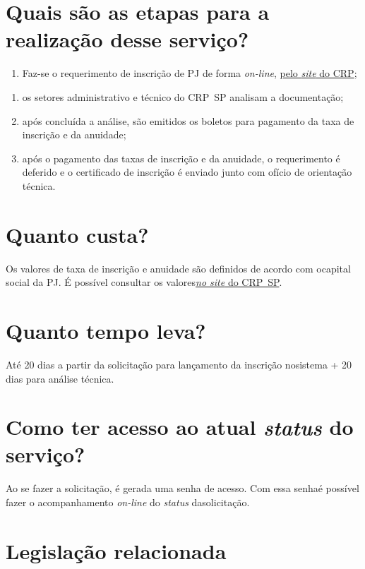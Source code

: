 \section{Quais são as etapas para a realização desse serviço?}

\begin{enumerate}
  \item  Faz-se o requerimento de inscrição de PJ de forma \emph{on-line},  \href{https://www.crpsp.org/pagina/view/30}{pelo \emph{site} do CRP};
\end{enumerate}

\begin{enumerate}
  \item  os setores administrativo e técnico do CRP~SP analisam a documentação;
  \item  após concluída a análise, são emitidos os boletos para pagamento da  taxa de inscrição e da anuidade;
  \item  após o pagamento das taxas de inscrição e da anuidade, o requerimento  é deferido e o certificado de inscrição é enviado junto com ofício de  orientação técnica.
\end{enumerate}

\section{Quanto custa?}

Os valores de taxa de inscrição e anuidade são definidos de acordo com ocapital social da PJ. É possível consultar os valores\href{https://www.crpsp.org/pagina/view/207}{\emph{no site} do CRP~SP}.

\section{Quanto tempo leva?}

Até 20 dias a partir da solicitação para lançamento da inscrição nosistema + 20 dias para análise técnica.

\section{Como ter acesso ao atual \emph{status} do serviço?}

Ao se fazer a solicitação, é gerada uma senha de acesso. Com essa senhaé possível fazer o acompanhamento \emph{on-line} do \emph{status} dasolicitação.

\section{Legislação relacionada}

